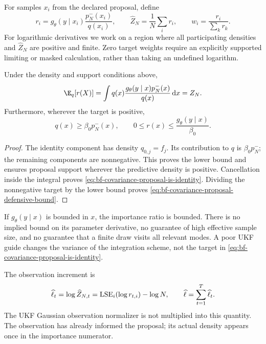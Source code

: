 For samples \(x_i\) from the declared proposal, define
\begin{equation}
\label{eq:bf-covariance-proposal-importance-ratio}
 r_i=g_\theta(y\mid x_i)\frac{p_N^-(x_i)}{q(x_i)},\qquad
 \widehat Z_N=\frac1N\sum_i r_i,\qquad
 w_i=\frac{r_i}{\sum_k r_k}.
\end{equation}
For logarithmic derivatives we work on a region where all participating
densities and \(\widehat Z_N\) are positive and finite.
Zero target weights require an explicitly supported limiting or masked
calculation, rather than taking an undefined logarithm.

\begin{proposition}
Under the density and support conditions above,
\begin{equation}
\label{eq:bf-covariance-proposal-is-identity}
 \E_q[r(X)]
 =\int q(x)\frac{g_\theta(y\mid x)p_N^-(x)}{q(x)}\,\bfCovDiff x
 =Z_N .
\end{equation}
Furthermore, wherever the target is positive,
\begin{equation}
\label{eq:bf-covariance-proposal-defensive-bound}
 q(x)\geq\beta_0p_N^-(x),\qquad
 0\leq r(x)\leq\frac{g_\theta(y\mid x)}{\beta_0}.
\end{equation}
\end{proposition}
\begin{proof}
The identity component has density \(q_{0,j}=f_j\). Its contribution to
\(q\) is \(\beta_0p_N^-\); the remaining components are nonnegative.
This proves the lower bound and ensures proposal support wherever the
predictive density is positive. Cancellation inside the integral proves
\eqref{eq:bf-covariance-proposal-is-identity}. Dividing the nonnegative target by the lower
bound proves \eqref{eq:bf-covariance-proposal-defensive-bound}.
\end{proof}

If \(g_\theta(y\mid x)\) is bounded in \(x\), the importance ratio is
bounded. There is no implied bound on its parameter derivative, no
guarantee of high effective sample size, and no guarantee that a finite
draw visits all relevant modes. A poor UKF guide changes the variance of
the integration scheme, not the target in \eqref{eq:bf-covariance-proposal-is-identity}.

The observation increment is
\begin{equation}
\label{eq:bf-covariance-proposal-log-increment}
 \widehat\ell_t
 =\log\widehat Z_{N,t}
 =\operatorname{LSE}_i(\log r_{t,i})-\log N,\qquad
 \widehat\ell=\sum_{t=1}^T\widehat\ell_t.
\end{equation}
The UKF Gaussian observation normalizer is not multiplied into this
quantity. The observation has already informed the proposal; its actual
density appears once in the importance numerator.

